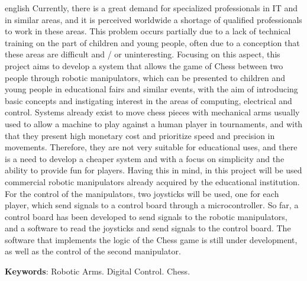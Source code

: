\begin{resumo}[Abstract]
 \begin{otherlanguage*}{english}
  Currently, there is a great demand for specialized professionals in IT and in similar areas, and it is perceived worldwide a shortage of qualified professionals to work in these areas.
  This problem occurs partially due to a lack of technical training on the part of children and young people, often due to a conception that these areas are difficult and / or uninteresting.
  Focusing on this aspect, this project aims to develop a system that allows the game of Chess between two people through robotic manipulators, which can be presented to children and young people in educational fairs and similar events, with the aim of introducing basic concepts and instigating interest in the areas of computing, electrical and control.
  Systems already exist to move chess pieces with mechanical arms usually used to allow a machine to play against a human player in tournaments, and with that they present high monetary cost and prioritize speed and precision in movements.
  Therefore, they are not very suitable for educational uses, and there is a need to develop a cheaper system and with a focus on simplicity and the ability to provide fun for players.
  Having this in mind, in this project will be used commercial robotic manipulators already acquired by the educational institution.
  For the control of the manipulators, two joysticks will be used, one for each player, which send signals to a control board through a microcontroller.
  So far, a control board has been developed to send signals to the robotic manipulators, and a software to read the joysticks and send signals to the control board.
  The software that implements the logic of the Chess game is still under development, as well as the control of the second manipulator.

   \vspace{\onelineskip}
 
   \noindent 
   \textbf{Keywords}: Robotic Arms. Digital Control. Chess.
 \end{otherlanguage*}
\end{resumo}



\listoffigures*
\cleardoublepage

\listoftables*
\cleardoublepage

